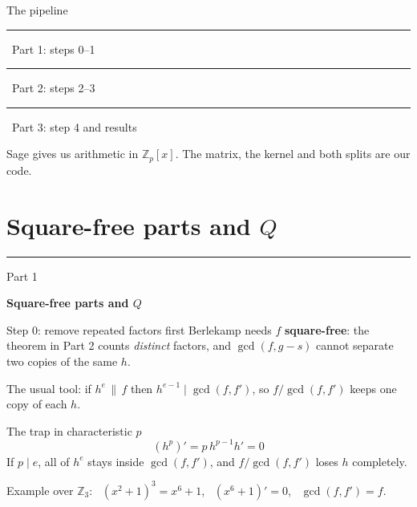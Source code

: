 \documentclass[aspectratio=169,11pt]{beamer}
\newcommand{\Zpx}{\mathbb{Z}_p[x]}
\newcommand{\aside}[1]{{\color{muted}\small #1}}
\newcommand{\partslide}[3]{%
  \section{#2}
  \begin{frame}[plain]
    \vfill
    {\color{#1}\rule{3em}{4pt}}\par\vspace{0.6em}
    {\color{muted}\large #3}\par\vspace{0.3em}
    {\Huge\bfseries #2}
    \vfill
  \end{frame}}
\begin{document}
\begin{frame}{The pipeline}
  \centering
  \par\vspace{1.4em}
  {\small
  {\color{m1}\rule{0.8em}{0.8em}}~Part 1: steps 0--1\qquad
  {\color{m2}\rule{0.8em}{0.8em}}~Part 2: steps 2--3\qquad
  {\color{m3}\rule{0.8em}{0.8em}}~Part 3: step 4 and results}
  \par\vspace{0.8em}
  \aside{Sage gives us arithmetic in $\Zpx$. The matrix, the kernel and both splits are our code.}
\end{frame}

\partslide{m1}{Square-free parts and $Q$}{Part 1}

\begin{frame}{Step 0: remove repeated factors first}
  Berlekamp needs $f$ \textbf{square-free}: the theorem in Part 2 counts \emph{distinct}
  factors, and $\gcd(f, g - s)$ cannot separate two copies of the same $h$.\par\medskip
  The usual tool: if $h^e \,\|\, f$ then $h^{e-1} \mid \gcd(f, f')$, so $f / \gcd(f, f')$ keeps one copy of each $h$.
  \bigskip
  \begin{block}{The trap in characteristic $p$}
    \[ (h^p)' = p\, h^{p-1} h' = 0 \]
    If $p \mid e$, all of $h^e$ stays inside $\gcd(f, f')$, and $f / \gcd(f, f')$ loses $h$ completely.
  \end{block}
  \bigskip
  Example over $\mathbb{Z}_3$: \ $(x^2 + 1)^3 = x^6 + 1$, \ $(x^6 + 1)' = 0$, \ $\gcd(f, f') = f$.
\end{frame}
\end{document}
